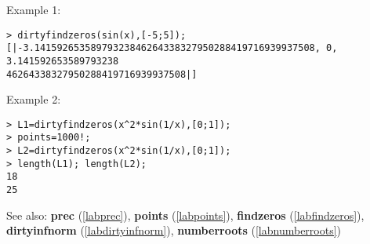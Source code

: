\noindent Example 1: 
\begin{center}\begin{minipage}{15cm}\begin{Verbatim}[frame=single]
> dirtyfindzeros(sin(x),[-5;5]);
[|-3.14159265358979323846264338327950288419716939937508, 0, 3.141592653589793238
46264338327950288419716939937508|]
\end{Verbatim}
\end{minipage}\end{center}
\noindent Example 2: 
\begin{center}\begin{minipage}{15cm}\begin{Verbatim}[frame=single]
> L1=dirtyfindzeros(x^2*sin(1/x),[0;1]);
> points=1000!;
> L2=dirtyfindzeros(x^2*sin(1/x),[0;1]);
> length(L1); length(L2);
18
25
\end{Verbatim}
\end{minipage}\end{center}
See also: \textbf{prec} (\ref{labprec}), \textbf{points} (\ref{labpoints}), \textbf{findzeros} (\ref{labfindzeros}), \textbf{dirtyinfnorm} (\ref{labdirtyinfnorm}), \textbf{numberroots} (\ref{labnumberroots})
